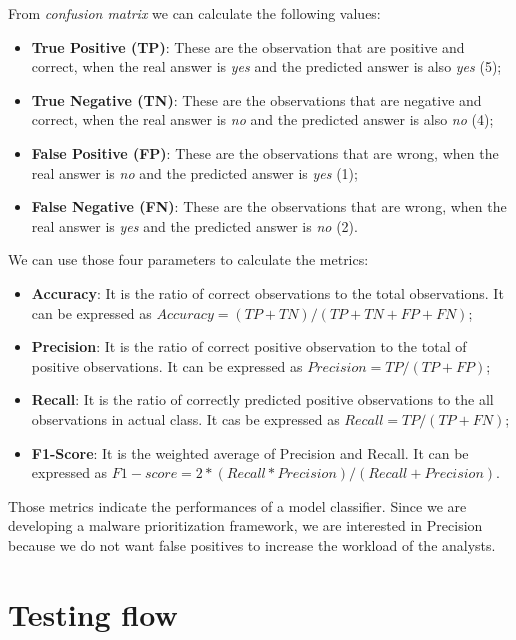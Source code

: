 From \textit{confusion matrix} we can calculate the following values:
\begin{itemize}
	\item \textbf{True Positive (TP)}: These are the observation that are positive and correct, when the real answer is \textit{yes} and the predicted answer is also \textit{yes} (5);
	\item \textbf{True Negative (TN)}: These are the observations that are negative and correct, when the real answer is \textit{no} and the predicted answer is also \textit{no} (4);
	\item \textbf{False Positive (FP)}: These are the observations that are wrong, when the real answer is  \textit{no} and the predicted answer is \textit{yes} (1); 
	\item \textbf{False Negative (FN)}: These are the observations that are wrong, when the real answer is  \textit{yes} and the predicted answer is \textit{no} (2).
	
	
\end{itemize} 

We can use those four parameters to calculate the metrics:
\begin{itemize}
	\item \textbf{Accuracy}: It is the ratio of correct observations to the total observations. It can be expressed as $Accuracy = (TP + TN) / (TP + TN + FP + FN)$;
	\item \textbf{Precision}: It is the ratio of correct positive observation to the total of positive observations. It can be expressed as $Precision = TP/(TP + FP)$;
	\item \textbf{Recall}: It is the ratio of  correctly predicted positive observations to the all observations in actual class. It cas be expressed as $Recall = TP/(TP + FN)$;
	\item \textbf{F1-Score}: It is the weighted average of Precision and Recall. It can be expressed as $F1-score = 2 * (Recall * Precision) / (Recall + Precision)$.
\end{itemize}
Those metrics indicate the performances of a model classifier. Since we are developing a malware prioritization framework, we are interested in Precision because we do not want false positives to increase the workload of the analysts. 


\section{Testing flow}
\label{sec:flow}

